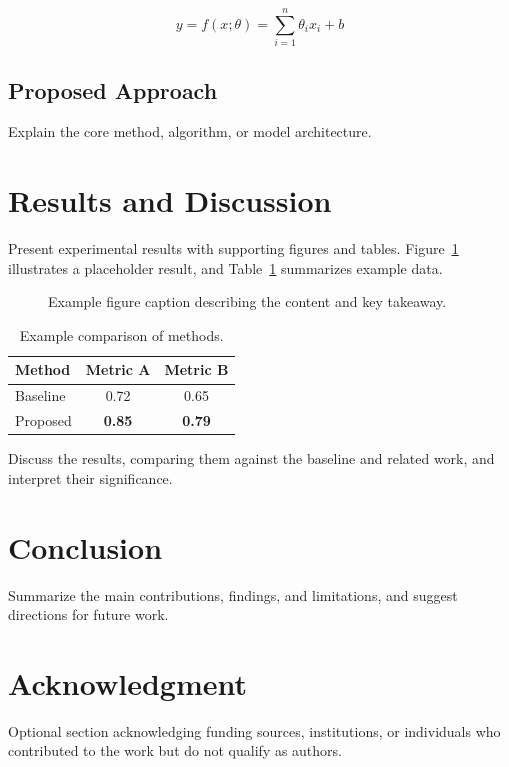 \documentclass{intlpaper}
\begin{document}
\begin{equation}
  y = f(x; \theta) = \sum_{i=1}^{n} \theta_i x_i + b
  \label{eq:example}
\end{equation}

\subsection{Proposed Approach}
Explain the core method, algorithm, or model architecture.

\section{Results and Discussion}
Present experimental results with supporting figures and tables.
Figure~\ref{fig:example} illustrates a placeholder result, and
Table~\ref{tab:example} summarizes example data.

\begin{figure}[t]
  \centering
  \caption{Example figure caption describing the content and key takeaway.}
  \label{fig:example}
\end{figure}

\begin{table}[t]
  \centering
  \caption{Example comparison of methods.}
  \label{tab:example}
  \begin{tabular}{lcc}
    \hline
    Method & Metric A & Metric B \\
    \hline
    Baseline    & 0.72 & 0.65 \\
    Proposed    & \textbf{0.85} & \textbf{0.79} \\
    \hline
  \end{tabular}
\end{table}

Discuss the results, comparing them against the baseline and related work,
and interpret their significance.

\section{Conclusion}
Summarize the main contributions, findings, and limitations, and suggest
directions for future work.

\section*{Acknowledgment}
Optional section acknowledging funding sources, institutions, or individuals
who contributed to the work but do not qualify as authors.



\end{document}
